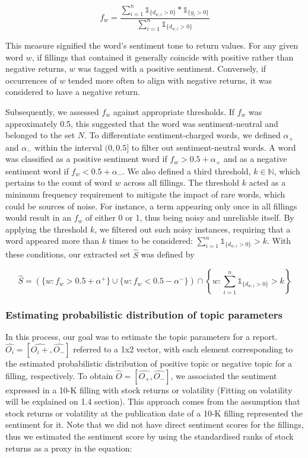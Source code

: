 \documentclass[logo,bsc,singlespacing,parskip]{infthesis}
\begin{document}
\begin{equation} \label{4.2}
f_w = \frac{\sum_{i=1}^{n} \mathbb{1}_{\{d_{w,i}>0\}} * \mathbb{1}_{\{y_i>0\}}}{\sum_{i=1}^{n} \mathbb{1}_{\{d_{w,i}>0\}}}
\end{equation}

This measure signified the word’s sentiment tone to return values. For any given word $w$, if fillings that contained it generally coincide with positive rather than negative returns, $w$ was tagged with a positive sentiment. Conversely, if occurrences of $w$ tended more often to align with negative returns, it was considered to have a negative return. 

Subsequently, we assessed $f_w$ against appropriate thresholds. If $f_w$ was approximately 0.5, this suggested that the word was sentiment-neutral and belonged to the set $N$. To differentiate sentiment-charged words, we defined $\alpha_+$ and $\alpha_-$ within the interval $(0, 0.5]$ to filter out sentiment-neutral words. A word was classified as a positive sentiment word if  $f_w > 0.5+\alpha_+$ and as a negative sentiment word if  $f_w < 0.5+\alpha_-$. We also defined a third threshold, $k \in \mathbb{N}$, which pertains to the count of word $w$ across all fillings. The threshold $k$ acted as a minimum frequency requirement to mitigate the impact of rare words, which could be sources of noise. For instance, a term appearing only once in all fillings would result in an $f_w$ of either 0 or 1, thus being noisy and unreliable itself. By applying the threshold $k$, we filtered out such noisy instances, requiring that a word appeared more than $k$ times to be considered: ${\sum_{i=1}^{n} \mathbb{1}_{\{d_{w,i}>0\}}} > k$. With these conditions, our extracted set $\hat{S}$ was defined by

\begin{equation} \label{4.3}
\hat{S} = \left( \{w : f_w > 0.5 + \alpha^+\} \cup \{w : f_w < 0.5 - \alpha^-\} \right) \cap \left\{ w : \sum_{i=1}^{n} \mathbb{1}_{\{d_{w,i}>0\}} > k \right\}
\end{equation}

\subsubsection{Estimating probabilistic distribution of topic parameters}

In this process, our goal was to estimate the topic parameters for a report. $\hat{O_i} =[\hat{O_i+},\hat{O_-}]$ referred to a 1x2 vector, with each element corresponding to the estimated probabilistic distribution of positive topic or negative topic for a filling, respectively. To obtain $\hat{O} =[\hat{O_+},\hat{O_-}]$, we associated the sentiment expressed in a 10-K filling with stock returns or volatility (Fitting on volatility will be explained on 1.4 section). This approach comes from the assumption that stock returns or volatility at the publication date of a 10-K filling represented the sentiment for it. Note that we did not have direct sentiment scores for the fillings, thus we estimated the sentiment score by using the standardised ranks of stock returns as a proxy in the equation:
\end{document}
